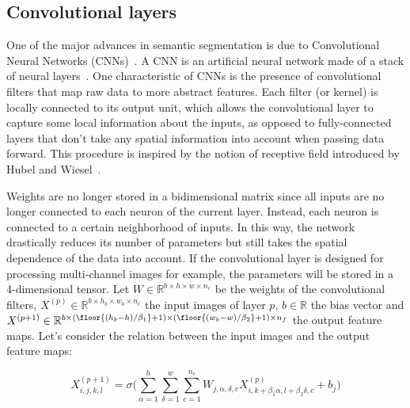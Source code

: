     \subsection{Convolutional layers} \label{convlayers}

        One of the major advances in semantic segmentation
        is due to Convolutional Neural Networks (CNNs)~\cite{DBLP:journals/corr/Garcia-GarciaOO17}.
        A CNN is an artificial neural network made of a stack of neural layers~\cite{lecun1998gradient}. One characteristic of CNNs is the
        presence of convolutional filters that map raw data to more abstract features. Each filter (or kernel) is locally connected to its output unit, which
        allows the convolutional layer to capture some local information about the inputs, as opposed to fully-connected layers that don't take any spatial
        information into account when passing data forward. This procedure is inspired by the notion of receptive field introduced
        by Hubel and Wiesel~\cite{Hubel1962}.

        Weights are no longer stored in a bidimensional matrix since all inputs are no longer connected to each neuron of the current layer.
        Instead, each neuron is connected to a certain neighborhood of inputs. In this way, the network drastically reduces its number of parameters
        but still takes the spatial dependence of the data into account. If the convolutional layer is designed for processing multi-channel images for example,
        the parameters will be stored in a 4-dimensional tensor. Let $W \in \mathbb{R}^{b \times h \times w \times n_c}$ be the weights of the convolutional filters,
        $X^{(p)} \in \mathbb{R}^{b \times h_b \times w_b \times n_c}$ the input images of layer $p$, $b \in \mathbb{R}$ the bias vector
        and $X^{(p+1)} \in \mathbb{R}^{b \times (\floor{(h_b - h) / \beta_1} + 1) \times (\floor{(w_b - w) / \beta_2} + 1) \times n_f}$  %
        the output feature maps. Let's consider the relation between the input images and the output feature maps:

        \begin{equation} \label{eq:conv2D}
            X_{i, j, k, l}^{(p+1)} = \sigma \Big( \sum\limits_{\alpha=1}^h \sum\limits_{\delta=1}^w
                \sum\limits_{c=1}^{n_c} W_{j, \alpha, \delta, c} X_{i, k+\beta_1 \alpha, l+\beta_2 \delta, c}^{(p)} + b_{j} \Big)
        \end{equation}

